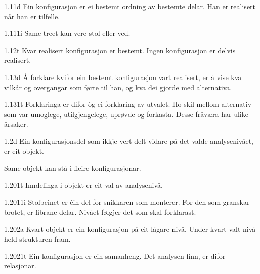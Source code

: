 \begin{formproposition}{1.11}{d}
Ein konfigurasjon er ei bestemt ordning av bestemte delar. Han er realisert når han er tilfelle.
\end{formproposition}

\begin{formproposition}{1.111}{i}
Same treet kan vere stol eller ved.
\end{formproposition}

\begin{formproposition}{1.12}{t}
Kvar realisert konfigurasjon er bestemt. Ingen konfigurasjon er delvis realisert.
\end{formproposition}

\begin{formproposition}{1.13}{d}
Å forklare kvifor ein bestemt konfigurasjon vart realisert, er å vise kva vilkår og overgangar som førte til han, og kva dei gjorde med alternativa.
\end{formproposition}

\begin{formproposition}{1.131}{t}
Forklaringa er difor òg ei forklaring av utvalet. Ho skil mellom alternativ som var umoglege, utilgjengelege, uprøvde og forkasta. Desse fråværa har ulike årsaker.
\end{formproposition}

\begin{formproposition}{1.2}{d}
Ein konfigurasjonsdel som ikkje vert delt vidare på det valde analysenivået, er eit objekt.

Same objekt kan stå i fleire konfigurasjonar.
\end{formproposition}

\begin{formproposition}{1.201}{t}
Inndelinga i objekt er eit val av analysenivå.
\end{formproposition}

\begin{formproposition}{1.2011}{i}
Stolbeinet er éin del for snikkaren som monterer. For den som granskar brotet, er fibrane delar. Nivået følgjer det som skal forklarast.
\end{formproposition}

\begin{formproposition}{1.202}{a}
Kvart objekt er ein konfigurasjon på eit lågare nivå. Under kvart valt nivå held strukturen fram.
\end{formproposition}

\begin{formproposition}{1.2021}{t}
Ein konfigurasjon er ein samanheng. Det analysen finn, er difor relasjonar.
\end{formproposition}

